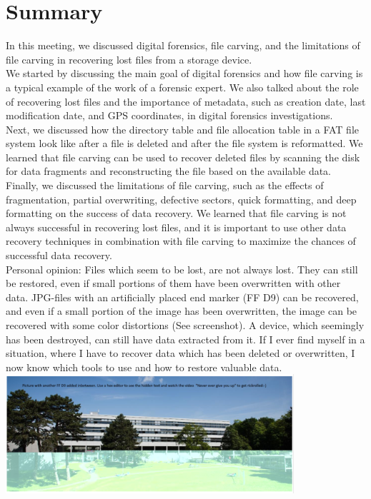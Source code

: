 \documentclass{scrreprt}
\begin{document}
\section{Summary}
In this meeting, we discussed digital forensics, file carving, and the limitations of file carving in recovering lost files from a storage device.
\\We started by discussing the main goal of digital forensics and how file carving is a typical example of the work of a forensic expert. We also talked about the role of recovering lost files and the importance of metadata, such as creation date, last modification date, and GPS coordinates, in digital forensics investigations.
\\Next, we discussed how the directory table and file allocation table in a FAT file system look like after a file is deleted and after the file system is reformatted. We learned that file carving can be used to recover deleted files by scanning the disk for data fragments and reconstructing the file based on the available data.
\\Finally, we discussed the limitations of file carving, such as the effects of fragmentation, partial overwriting, defective sectors, quick formatting, and deep formatting on the success of data recovery. We learned that file carving is not always successful in recovering lost files, and it is important to use other data recovery techniques in combination with file carving to maximize the chances of successful data recovery.
\\\newline Personal opinion: Files which seem to be lost, are not always lost. They can still be restored, even if small portions of them have been overwritten with other data. JPG-files with an artificially placed end marker (FF D9) can be recovered, and even if a small portion of the image has been overwritten, the image can be recovered with some color distortions (See screenshot). A device, which seemingly has been destroyed, can still have data extracted from it. If I ever find myself in a situation, where I have to recover data which has been deleted or overwritten, I now know which tools to use and how to restore valuable data.
\\\includegraphics[width=0.8\textwidth]{"graphics/thu"}
\end{document}
